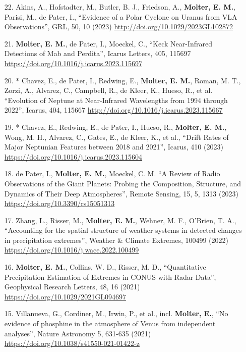 \documentclass[margin, 10pt]{res} %
\begin{document}
\begin{resume}
{\begin{enumerate}
\item[22.] Akins, A., Hofstadter, M., Butler, B. J., Friedson, A., {\bf Molter, E. M.}, Parisi, M., de Pater, I., ``Evidence of a Polar Cyclone on Uranus from VLA Observations'', GRL, 50, 10 (2023) \url{http://doi.org/10.1029/2023GL102872}
	
\item[21.] {\bf Molter, E. M.}, de Pater, I., Moeckel, C., ``Keck Near-Infrared Detections of Mab and Perdita'', Icarus Letters, 405, 115697 \url{https://doi.org/10.1016/j.icarus.2023.115697}
	
\item[20.]* Chavez, E., de Pater, I., Redwing, E., {\bf Molter, E. M.}, Roman, M. T., Zorzi, A., Alvarez, C., Campbell, R., de Kleer, K., Hueso, R., et al. ``Evolution of Neptune at Near-Infrared Wavelengths from 1994 through 2022'', Icarus, 404, 115667  \url{http://doi.org/10.1016/j.icarus.2023.115667}

\item[19.]* Chavez, E., Redwing, E., de Pater, I., Hueso, R., {\bf Molter, E. M.}, Wong, M. H.,  Alvarez, C., Gates, E., de Kleer, K., et al.,  ``Drift Rates of Major Neptunian Features between 2018 and 2021'', Icarus, 410 (2023) \url{https://doi.org/10.1016/j.icarus.2023.115604}
	
\item[18.] de Pater, I., {\bf Molter, E. M.}, Moeckel, C. M. ``A Review of Radio Observations of the Giant Planets: Probing the Composition, Structure, and Dynamics of Their Deep Atmospheres'', Remote Sensing, 15, 5, 1313 (2023) \url{https://doi.org/10.3390/rs15051313}
	
\item[17.] Zhang, L., Risser, M., {\bf Molter, E. M.}, Wehner, M. F., O'Brien, T. A., ``Accounting for the spatial structure of weather systems in detected changes in precipitation extremes'', Weather \& Climate Extremes, 100499 (2022) \url{https://doi.org/10.1016/j.wace.2022.100499}

\item[16.] {\bf Molter, E. M.}, Collins, W. D., Risser, M. D., ``Quantitative Precipitation Estimation of Extremes in CONUS with Radar Data'', Geophysical Research Letters, 48, 16 (2021) \url{https://doi.org/10.1029/2021GL094697}

\item[15.] Villanueva, G., Cordiner, M., Irwin, P., et al., incl. {\bf Molter, E.}, ``No evidence of phosphine in the atmosphere of Venus from independent analyses'', Nature Astronomy 5, 631-635 (2021) \url{https://doi.org/10.1038/s41550-021-01422-z}


\end{enumerate}}
\end{resume}
\end{document}
